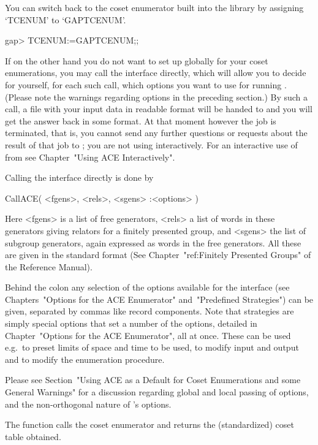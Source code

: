 You can switch back  to the  coset enumerator  built into  the {\GAP}
library by assigning `TCENUM' to `GAPTCENUM'.

\begintt
gap> TCENUM:=GAPTCENUM;;
\endtt


If on  the other hand you  do not want  to set up {\ACE}  globally for
your coset  enumerations, you may call the  {\ACE} interface directly,
which will allow you to decide for yourself, for each such call, which
options you  want to use for running {\ACE}. (Please note the warnings
regarding options in the preceding section.)  By such a call,  a  file
with  your input  data in  {\ACE} readable  format will  be  handed to
{\ACE} and you will get the answer back in some {\GAP} format. At that
moment however the {\ACE} job  is terminated, that is, you cannot send
any  further questions or  requests about  the result  of that  job to
{\ACE}; you  are not using  {\ACE} interactively.  For  an interactive
use of {\ACE} from {\GAP} see Chapter~"Using ACE Interactively".

Calling the {\ACE} interface directly is done by

\>CallACE( <fgens>, <rels>, <sgens> :<options> )

Here <fgens> is  a list of free generators, <rels> a  list of words in
these generators  giving relators for a finitely  presented group, and
<sgens> the list  of subgroup generators, again expressed  as words in
the free generators. All these are given in the standard {\GAP} format
(See Chapter~"ref:Finitely  Presented Groups" of  the {\GAP} Reference
Manual).

Behind the colon any selection of the options available for the interface
(see Chapters~"Options for the ACE Enumerator" and~"Predefined Strategies")
can be given, separated by commas like record components. Note that
strategies  are simply  special options   that set   a   number   of
the   options,  detailed   in Chapter~"Options for the ACE Enumerator",
all at once.  These  can be used e.g.~to preset limits of space and time
to be  used,  to  modify input and output and to modify the enumeration
procedure.

Please  see Section~"Using ACE as a Default for Coset Enumerations and 
some General Warnings" for a discussion  regarding  global  and  local
passing of options, and the non-orthogonal nature of {\ACE}'s options.

The  function   calls the  {\ACE}  coset  enumerator  and returns  the
(standardized) coset table obtained.

